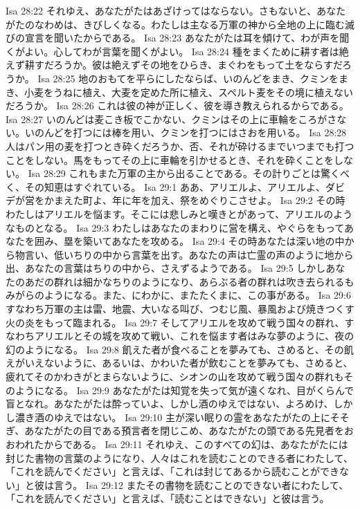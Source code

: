 Isa 28:22  それゆえ、あなたがたはあざけってはならない。さもないと、あなたがたのなわめは、きびしくなる。わたしは主なる万軍の神から全地の上に臨む滅びの宣言を聞いたからである。
Isa 28:23  あなたがたは耳を傾けて、わが声を聞くがよい。心してわが言葉を聞くがよい。
Isa 28:24  種をまくために耕す者は絶えず耕すだろうか。彼は絶えずその地をひらき、まぐわをもって土をならすだろうか。
Isa 28:25  地のおもてを平らにしたならば、いのんどをまき、クミンをまき、小麦をうねに植え、大麦を定めた所に植え、スペルト麦をその境に植えないだろうか。
Isa 28:26  これは彼の神が正しく、彼を導き教えられるからである。
Isa 28:27  いのんどは麦こき板でこかない、クミンはその上に車輪をころがさない。いのんどを打つには棒を用い、クミンを打つにはさおを用いる。
Isa 28:28  人はパン用の麦を打つとき砕くだろうか、否、それが砕けるまでいつまでも打つことをしない。馬をもってその上に車輪を引かせるとき、それを砕くことをしない。
Isa 28:29  これもまた万軍の主から出ることである。その計りごとは驚くべく、その知恵はすぐれている。
Isa 29:1  ああ、アリエルよ、アリエルよ、ダビデが営をかまえた町よ、年に年を加え、祭をめぐりこさせよ。
Isa 29:2  その時わたしはアリエルを悩ます。そこには悲しみと嘆きとがあって、アリエルのようなものとなる。
Isa 29:3  わたしはあなたのまわりに営を構え、やぐらをもってあなたを囲み、塁を築いてあなたを攻める。
Isa 29:4  その時あなたは深い地の中から物言い、低いちりの中から言葉を出す。あなたの声は亡霊の声のように地から出、あなたの言葉はちりの中から、さえずるようである。
Isa 29:5  しかしあなたのあだの群れは細かなちりのようになり、あらぶる者の群れは吹き去られるもみがらのようになる。また、にわかに、またたくまに、この事がある。
Isa 29:6  すなわち万軍の主は雷、地震、大いなる叫び、つむじ風、暴風および焼きつくす火の炎をもって臨まれる。
Isa 29:7  そしてアリエルを攻めて戦う国々の群れ、すなわちアリエルとその城を攻めて戦い、これを悩ます者はみな夢のように、夜の幻のようになる。
Isa 29:8  飢えた者が食べることを夢みても、さめると、その飢えがいえないように、あるいは、かわいた者が飲むことを夢みても、さめると、疲れてそのかわきがとまらないように、シオンの山を攻めて戦う国々の群れもそのようになる。
Isa 29:9  あなたがたは知覚を失って気が遠くなれ、目がくらんで盲となれ。あなたがたは酔っていよ、しかし酒のゆえではない、よろめけ、しかし濃き酒のゆえではない。
Isa 29:10  主が深い眠りの霊をあなたがたの上にそそぎ、あなたがたの目である預言者を閉じこめ、あなたがたの頭である先見者をおおわれたからである。
Isa 29:11  それゆえ、このすべての幻は、あなたがたには封じた書物の言葉のようになり、人々はこれを読むことのできる者にわたして、「これを読んでください」と言えば、「これは封じてあるから読むことができない」と彼は言う。
Isa 29:12  またその書物を読むことのできない者にわたして、「これを読んでください」と言えば、「読むことはできない」と彼は言う。
